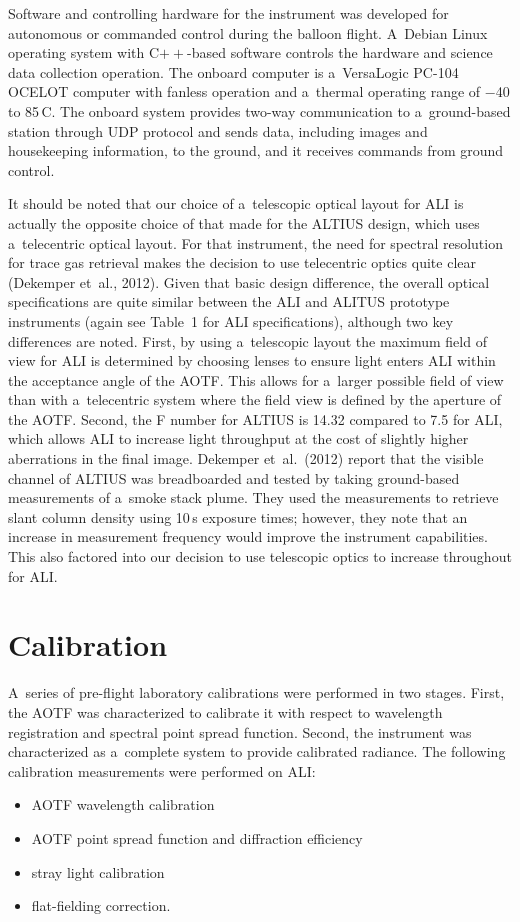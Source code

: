 \documentclass[amt]{copernicus}
\begin{document}
Software and controlling hardware for the instrument was developed for
autonomous or commanded control during the balloon flight. A~Debian
Linux operating system with C$++$-based software controls the hardware
and science data collection operation. The onboard computer is
a~VersaLogic PC-104 OCELOT computer with fanless operation and
a~thermal operating range of $-$40 to 85\,{\degree}C. The onboard
system provides two-way communication to a~ground-based station
through UDP protocol and sends data, including images and housekeeping
information, to the ground, and it receives commands from ground
control.

It should be noted that our choice of a~telescopic optical layout for ALI is
actually the opposite choice of that made for the ALTIUS design, which uses
a~telecentric optical layout. For that instrument, the need for spectral
resolution for trace gas retrieval makes the decision to use telecentric
optics quite clear (Dekemper et~al., 2012). Given that basic design
difference, the overall optical specifications are quite similar between the
ALI and ALITUS prototype instruments (again see Table~1 for ALI
specifications), although two key differences are noted. First, by using
a~telescopic layout the maximum field of view for ALI is determined by
choosing lenses to ensure light enters ALI within the acceptance angle of the
AOTF. This allows for a~larger possible field of view than with a~telecentric
system where the field view is defined by the aperture of the AOTF. Second,
the F number for ALTIUS is 14.32 compared to 7.5 for ALI, which allows ALI to
increase light throughput at the cost of slightly higher aberrations in the
final image. Dekemper et~al.~(2012) report that the visible channel of
ALTIUS was breadboarded and tested by taking ground-based measurements of
a~smoke stack plume. They used the measurements to retrieve  slant
column density using 10\,s exposure times; however, they note that an
increase in measurement frequency would improve the instrument capabilities.
This also factored into our decision to use telescopic optics to increase
throughout for ALI.



\section{Calibration}

A~series of pre-flight laboratory calibrations were performed in two
stages. First, the AOTF was characterized to calibrate it with
respect to wavelength registration and spectral point spread
function. Second, the instrument was characterized as a~complete
system to provide calibrated radiance. The following calibration
measurements were performed on ALI:
\begin{itemize}
\item AOTF wavelength calibration
\item AOTF point spread function and diffraction efficiency
\item stray light calibration
\item flat-fielding correction.
\end{itemize}
\end{document}
